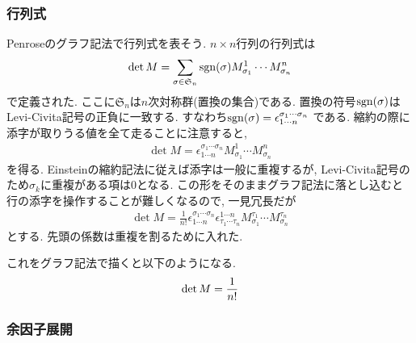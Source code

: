 \documentclass[dvipdfmx]{jsarticle}
\begin{document}
\subsubsection{行列式}
\label{sec: levicivita: determinant}

Penroseのグラフ記法で行列式を表そう.
$n\times n$行列の行列式は
\begin{align*}
    \det M
    =
    \sum_{\sigma\in\mathfrak{S}_n}
    \mathrm{sgn}(\sigma)M^1_{\sigma_1}\cdots M^n_{\sigma_n}
\end{align*}
で定義された.
ここに$\mathfrak{S}_n$は$n$次対称群(置換の集合)である.
置換の符号$\mathrm{sgn}(\sigma)$はLevi-Civita記号の正負に一致する.
すなわち$\mathrm{sgn}(\sigma)=\epsilon^{\sigma_1\cdots\sigma_n}_{1\cdots n}$
である.
縮約の際に添字が取りうる値を全て走ることに注意すると,
\begin{align*}
    \det M
    =
    \epsilon^{\sigma_1\cdots\sigma_n}_{1\cdots n}
    M^1_{\sigma_1}\cdots M^n_{\sigma_n}
\end{align*}
を得る.
Einsteinの縮約記法に従えば添字は一般に重複するが, Levi-Civita記号のため$\sigma_k$に重複がある項は0となる.
この形をそのままグラフ記法に落とし込むと行の添字を操作することが難しくなるので, 一見冗長だが
\begin{align}
    \label{eq: levicivita: det with levicivita}
    \det M
    =
    \frac{1}{n!}
    \epsilon^{\sigma_1\cdots\sigma_n}_{1\cdots n}
    \epsilon_{\tau_1\cdots\tau_n}^{1\cdots n}
    M^{\tau_1}_{\sigma_1}\cdots M^{\tau_n}_{\sigma_n}
\end{align}
とする.
先頭の係数は重複を割るために入れた.

これをグラフ記法で描くと以下のようになる.
\begin{equation}
    \label{eqfig: levicivita: determinant}
    \det M
    =
    \frac{1}{n!}
    \vcenter{\hbox{}}
\end{equation}


\subsubsection{余因子展開}
\end{document}
